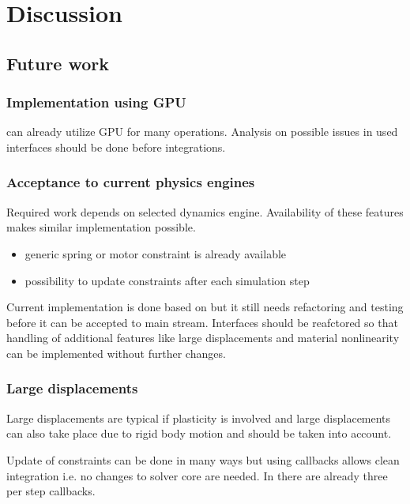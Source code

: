 \section{Discussion}

\subsection{Future work}
\label{subsec:futureWork}

\subsubsection{Implementation using GPU}
\bullet can already utilize GPU for many operations. 
Analysis on possible issues in used interfaces should be done before integrations.

\subsubsection{Acceptance to current physics engines}

Required work depends on selected dynamics engine. Availability of these features makes similar 
implementation possible.

\begin{itemize}
\item generic spring or motor constraint is already available 
\item possibility to update constraints after each simulation step
\end{itemize}

Current implementation is done based on \bullet but it still needs refactoring and testing before it can be 
accepted to main stream. Interfaces should be reafctored so that handling of additional features like large 
displacements and material nonlinearity can be implemented without further changes.

\subsubsection{Large displacements}
Large displacements are typical if plasticity is involved and
large displacements can also take place due to rigid body motion and should be taken into account.

Update of constraints can be done in  many ways but using callbacks allows clean integration i.e. no changes
to solver core are needed.
In \bullet there are already three per step callbacks. 

